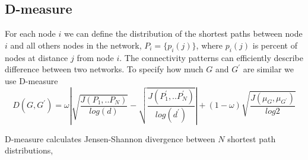 






\subsection{D-measure}


For each node $i$ we can define the distribution of the shortest paths between node $i$ and all others nodes in the network, $P_{i}=\{p_{i}(j)\}$, where $p_{i}(j)$ is percent of nodes at distance $j$ from node $i$. The connectivity patterns can efficiently describe difference between two networks.    
To specify how much $G$ and $G^{'}$ are similar we use D-measure \cite{tiago2}
\begin{equation}
D(G, G^{'}) = \omega \left| \sqrt{\frac{J(P_1,..P_N)}{log(d)}}-\sqrt{\frac{J(P_1^{'},..P_N^{'})}{log(d^{'})}} \right| + (1-\omega) \sqrt{\frac{J(\mu_{G},\mu_{G^{'}})}{log2}}
\label{eq:dmeasure}
\end{equation}

D-measure calculates Jensen-Shannon divergence between $N$ shortest path distributions,


